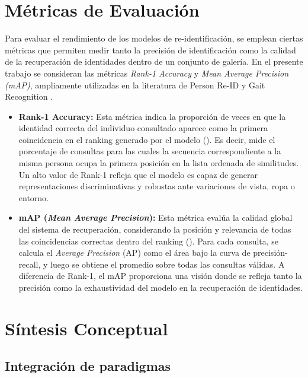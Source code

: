 \section{Métricas de Evaluación}
Para evaluar el rendimiento de los modelos de re-identificación, se emplean ciertas métricas que permiten medir tanto la precisión de identificación como la calidad de la recuperación de identidades dentro de un conjunto de galería. En el presente trabajo se consideran las métricas \textit{Rank-1 Accuracy} y \textit{Mean Average Precision (mAP)}, ampliamente utilizadas en la literatura de Person Re-ID y Gait Recognition \citep{Asperti2024ReviewReID}.

\begin{itemize}
    \item \textbf{Rank-1 Accuracy:} Esta métrica indica la proporción de veces en que la identidad correcta del individuo consultado aparece como la primera coincidencia en el ranking generado por el modelo (\cite{Asperti2024ReviewReID}). Es decir, mide el porcentaje de consultas para las cuales la secuencia correspondiente a la misma persona ocupa la primera posición en la lista ordenada de similitudes. Un alto valor de Rank-1 refleja que el modelo es capaz de generar representaciones discriminativas y robustas ante variaciones de vista, ropa o entorno.
    
    \item \textbf{mAP (\textit{Mean Average Precision}):} Esta métrica evalúa la calidad global del sistema de recuperación, considerando la posición y relevancia de todas las coincidencias correctas dentro del ranking (\cite{Asperti2024ReviewReID}). Para cada consulta, se calcula el \textit{Average Precision} (AP) como el área bajo la curva de precisión-recall, y luego se obtiene el promedio sobre todas las consultas válidas. A diferencia de Rank-1, el mAP proporciona una visión donde se refleja tanto la precisión como la exhaustividad del modelo en la recuperación de identidades.
\end{itemize}

\section{Síntesis Conceptual}

\subsection{Integración de paradigmas}

